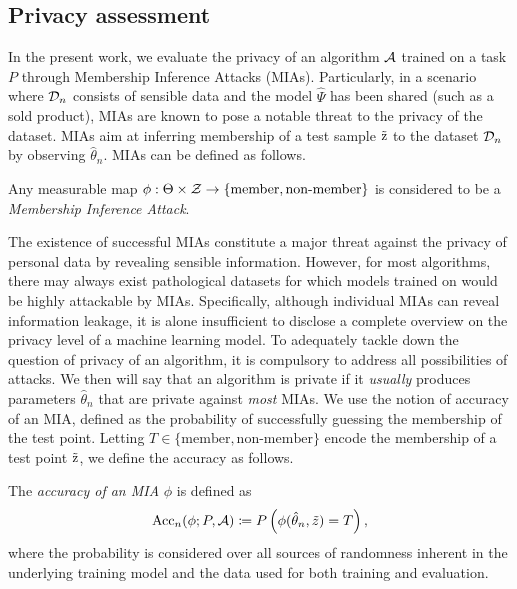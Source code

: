 \subsection{Privacy assessment}
\label{ssec:privacy_ass}

In the present work, we evaluate the privacy of an algorithm ${\mathcal{A}}$ trained on a task $P$ through Membership Inference Attacks (MIAs). Particularly, in a scenario where ${\mathcal{D}}_n$ consists of sensible data and the model $\hat\Psi$ has been shared (such as a sold product), MIAs are known to pose a notable threat to the privacy of the dataset. MIAs aim at inferring membership of a test sample $\Tilde{{\textnormal{z}}}$ to the dataset ${\mathcal{D}}_n$ by observing $\hat{\theta}_n$. MIAs can be defined as follows.

\begin{definition} Any measurable map $\phi : \Theta\times{\mathcal{Z}}\to\{\text{member},\text{non-member}\}$ is considered to be a \textit{Membership Inference Attack}.
\end{definition}

The existence of successful MIAs constitute a major threat against the privacy of personal data by revealing sensible information. However, for most algorithms, there may always exist pathological datasets for which models trained on would be highly attackable by MIAs. Specifically, although individual MIAs can reveal information leakage, it is alone insufficient to disclose a complete overview on the privacy level of a machine learning model. To adequately tackle down the question of privacy of an algorithm, it is compulsory to address all possibilities of attacks. We then will say that an algorithm is private if it \textit{usually} produces parameters $\hat{\theta}_n$ that are private against \textit{most} MIAs. We use the notion of accuracy of an MIA, defined as the probability of successfully guessing the membership of the test point. 
Letting $T\in\{\text{member},\text{non-member}\}$ encode the membership of a test point $\Tilde{{\textnormal{z}}}$, we define the accuracy as follows. 




\begin{definition} The \textit{accuracy of an MIA} $\phi$ is defined as 
\begin{equation}
\label{def:perf}
{\text{Acc}}_n(\phi; P,{\mathcal{A}} ) \coloneqq P\left (\phi(\hat{\theta}_n,\Tilde{z})= T\right ),
\end{equation}
where the probability is considered over all sources of randomness inherent in the underlying training model and the data used for both training and evaluation.
\end{definition}

